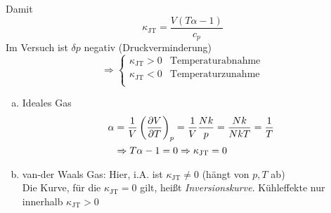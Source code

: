 Damit
\begin{equation}
    \kappa_\text{JT} = \frac{V \left( T \alpha - 1 \right) }{c_p}
\end{equation}
Im Versuch ist $\delta p$ negativ (Druckverminderung)
\begin{equation}
    \Rightarrow
    \begin{cases}
        \kappa_\text{JT} > 0 & \text{Temperaturabnahme} \\
        \kappa_\text{JT} < 0 & \text{Temperaturzunahme} \\
    \end{cases}
\end{equation}
\begin{enumerate}[a)]  %
    \item Ideales Gas
    \begin{equation}
        \begin{split}
            \alpha &= \frac{1}{V} \left( \frac{\partial V}{\partial T} \right)_{p} = \frac{1}{V} \frac{N k}{p} = \frac{N k}{N k T} = \frac{1}{T} \\
            & \Rightarrow T \alpha - 1 = 0 \Rightarrow \kappa_\text{JT} = 0
        \end{split}
    \end{equation}
    \item van-der Waals Gas: Hier, i.A. ist $\kappa_\text{JT} \neq 0$ (hängt von $p, T$ ab) \\
    Die Kurve, für die $\kappa_\text{JT} = 0 $ gilt, heißt \emph{Inversionskurve}. Kühleffekte nur innerhalb
    $\kappa_\text{JT} > 0$
\end{enumerate}

